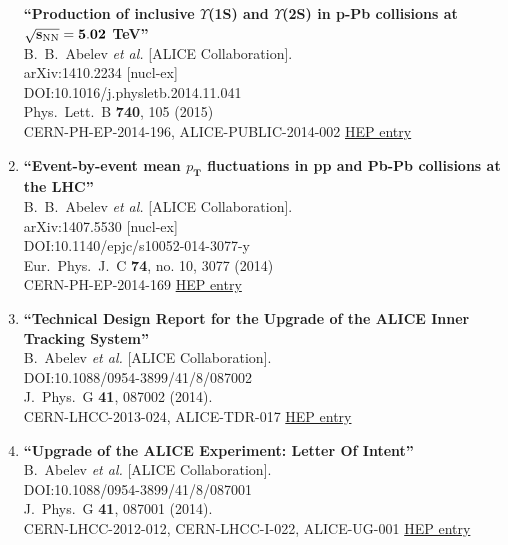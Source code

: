 \begin{enumerate}
{\bf ``Production of inclusive $\Upsilon$(1S) and $\Upsilon$(2S) in p-Pb collisions at $\mathbf{\sqrt{s_{{\rm NN}}} = 5.02}$ TeV''}
  \\{}B.~B.~Abelev {\it et al.} [ALICE Collaboration].
  \\{}arXiv:1410.2234 [nucl-ex]
  \\{}DOI:10.1016/j.physletb.2014.11.041
  \\{}Phys.\ Lett.\ B {\bf 740}, 105 (2015)
  \\{}CERN-PH-EP-2014-196, ALICE-PUBLIC-2014-002
\href{http://inspirehep.net/record/1321022}{HEP entry}
\item%
{\bf ``Event-by-event mean ${p}_{\mathbf {T}}$ fluctuations in pp and Pb-Pb collisions at the LHC''}
  \\{}B.~B.~Abelev {\it et al.} [ALICE Collaboration].
  \\{}arXiv:1407.5530 [nucl-ex]
  \\{}DOI:10.1140/epjc/s10052-014-3077-y
  \\{}Eur.\ Phys.\ J.\ C {\bf 74}, no. 10, 3077 (2014)
  \\{}CERN-PH-EP-2014-169
\href{http://inspirehep.net/record/1307102}{HEP entry}
\item%
{\bf ``Technical Design Report for the Upgrade of the ALICE Inner Tracking System''}
  \\{}B.~Abelev {\it et al.} [ALICE Collaboration].
  \\{}DOI:10.1088/0954-3899/41/8/087002
  \\{}J.\ Phys.\ G {\bf 41}, 087002 (2014).
  \\{}CERN-LHCC-2013-024, ALICE-TDR-017
\href{http://inspirehep.net/record/1305021}{HEP entry}
\item%
{\bf ``Upgrade of the ALICE Experiment: Letter Of Intent''}
  \\{}B.~Abelev {\it et al.} [ALICE Collaboration].
  \\{}DOI:10.1088/0954-3899/41/8/087001
  \\{}J.\ Phys.\ G {\bf 41}, 087001 (2014).
  \\{}CERN-LHCC-2012-012, CERN-LHCC-I-022, ALICE-UG-001
\href{http://inspirehep.net/record/1305020}{HEP entry}

\end{enumerate}
